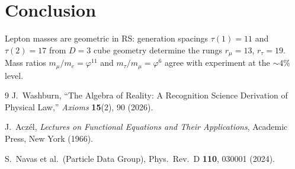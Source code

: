 \documentclass[12pt,a4paper]{article}
\theoremstyle{definition}
\theoremstyle{remark}
\begin{document}
\section{Conclusion}
\label{sec:conclusion}

Lepton masses are geometric in RS: generation spacings $\tau(1) =
11$ and $\tau(2) = 17$ from $D = 3$ cube geometry determine the
rungs $r_\mu = 13$, $r_\tau = 19$.  Mass ratios $m_\mu/m_e =
\varphi^{11}$ and $m_\tau/m_\mu = \varphi^{6}$ agree with
experiment at the $\sim 4\%$ level.

\begin{thebibliography}{9}
J.~Washburn, ``The Algebra of Reality: A Recognition Science Derivation
of Physical Law,'' \emph{Axioms} \textbf{15}(2), 90 (2026).

J.~Acz\'el, \textit{Lectures on Functional Equations and Their Applications},
Academic Press, New York (1966).

S.~Navas et al.\ (Particle Data Group), Phys.\ Rev.\ D \textbf{110},
030001 (2024).
\end{thebibliography}
\end{document}
